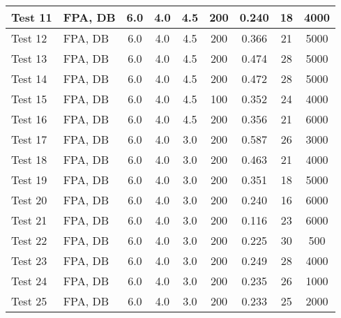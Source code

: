 \begin{table}[!h]
\begin{center}
\begin{tabular}{|l|l|c|c|c|c|c|c|c|}
Test 11    &  FPA, DB           &  6.0       &  4.0       &  4.5       &  200            &  0.240          &  18                &  4000            \\ \hline
Test 12    &  FPA, DB           &  6.0       &  4.0       &  4.5       &  200            &  0.366          &  21                &  5000            \\ \hline
Test 13    &  FPA, DB           &  6.0       &  4.0       &  4.5       &  200            &  0.474          &  28                &  5000            \\ \hline
Test 14    &  FPA, DB           &  6.0       &  4.0       &  4.5       &  200            &  0.472          &  28                &  5000            \\ \hline
Test 15    &  FPA, DB           &  6.0       &  4.0       &  4.5       &  100            &  0.352          &  24                &  4000            \\ \hline
Test 16    &  FPA, DB           &  6.0       &  4.0       &  4.5       &  200            &  0.356          &  21                &  6000            \\ \hline
Test 17    &  FPA, DB           &  6.0       &  4.0       &  3.0       &  200            &  0.587          &  26                &  3000            \\ \hline
Test 18    &  FPA, DB           &  6.0       &  4.0       &  3.0       &  200            &  0.463          &  21                &  4000            \\ \hline
Test 19    &  FPA, DB           &  6.0       &  4.0       &  3.0       &  200            &  0.351          &  18                &  5000            \\ \hline
Test 20    &  FPA, DB           &  6.0       &  4.0       &  3.0       &  200            &  0.240          &  16                &  6000            \\ \hline
Test 21    &  FPA, DB           &  6.0       &  4.0       &  3.0       &  200            &  0.116          &  23                &  6000            \\ \hline
Test 22    &  FPA, DB           &  6.0       &  4.0       &  3.0       &  200            &  0.225          &  30                &  500             \\ \hline
Test 23    &  FPA, DB           &  6.0       &  4.0       &  3.0       &  200            &  0.249          &  28                &  4000            \\ \hline
Test 24    &  FPA, DB           &  6.0       &  4.0       &  3.0       &  200            &  0.235          &  26                &  1000            \\ \hline
Test 25    &  FPA, DB           &  6.0       &  4.0       &  3.0       &  200            &  0.233          &  25                &  2000            \\ \hline
\end{tabular}
\end{center}
\end{table}

